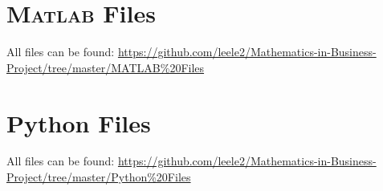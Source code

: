 \begin{appendices}
    \chapter{\textsc{Matlab} Files}
        All files can be found: \small\url{https://github.com/leele2/Mathematics-in-Business-Project/tree/master/MATLAB%20Files}

        

        

    \chapter{Python Files}
        All files can be found: \small\url{https://github.com/leele2/Mathematics-in-Business-Project/tree/master/Python%20Files}

        
\end{appendices}